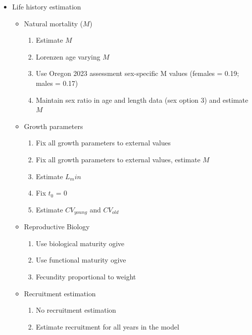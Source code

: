 \documentclass[
]{scrartcl}
\providecommand{\tightlist}{%
  \setlength{\itemsep}{0pt}\setlength{\parskip}{0pt}}\usepackage{longtable,booktabs,array}
\begin{document}
\begin{itemize}
\tightlist
\item
  Life history estimation

  \begin{itemize}
  \tightlist
  \item
    Natural mortality (\(M\))

    \begin{enumerate}
    \def\labelenumi{\arabic{enumi}.}
    \tightlist
    \item
      Estimate \(M\)
    \item
      Lorenzen age varying \(M\)
    \item
      Use Oregon 2023 assessment sex-specific M values (females = 0.19;
      males = 0.17)
    \item
      Maintain sex ratio in age and length data (sex option 3) and
      estimate \(M\)
    \end{enumerate}
  \item
    Growth parameters

    \begin{enumerate}
    \def\labelenumi{\arabic{enumi}.}
    \setcounter{enumi}{5}
    \tightlist
    \item
      Fix all growth parameters to external values
    \item
      Fix all growth parameters to external values, estimate \(M\)
    \item
      Estimate \(L_min\)
    \item
      Fix \(t_0\) = 0
    \item
      Estimate \(CV_{young}\) and \(CV_{old}\)
    \end{enumerate}
  \item
    Reproductive Biology

    \begin{enumerate}
    \def\labelenumi{\arabic{enumi}.}
    \setcounter{enumi}{9}
    \tightlist
    \item
      Use biological maturity ogive
    \item
      Use functional maturity ogive
    \item
      Fecundity proportional to weight
    \end{enumerate}
  \item
    Recruitment estimation

    \begin{enumerate}
    \def\labelenumi{\arabic{enumi}.}
    \setcounter{enumi}{12}
    \tightlist
    \item
      No recruitment estimation
    \item
      Estimate recruitment for all years in the model
    \end{enumerate}
  \end{itemize}
\end{itemize}
\end{document}
